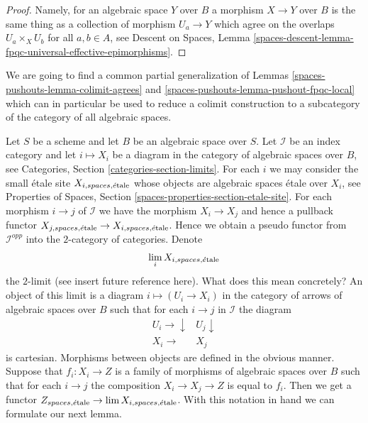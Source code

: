 \begin{proof}
Namely, for an algebraic space $Y$ over $B$ a morphism $X \to Y$ over $B$
is the same thing as a collection of morphism $U_a \to Y$ which agree on
the overlaps $U_a \times_X U_b$ for all $a, b \in A$, see
Descent on Spaces, Lemma
\ref{spaces-descent-lemma-fpqc-universal-effective-epimorphisms}.
\end{proof}

We are going to find a common partial generalization of
Lemmas \ref{spaces-pushouts-lemma-colimit-agrees} and \ref{spaces-pushouts-lemma-pushout-fpqc-local}
which can in particular be used to reduce a colimit construction to a
subcategory of the category of all algebraic spaces.

\medskip\noindent
Let $S$ be a scheme and let $B$ be an algebraic space over $S$. Let
$\mathcal{I}$ be an index category and let $i \mapsto X_i$
be a diagram in the category of algebraic spaces over $B$,
see Categories, Section \ref{categories-section-limits}.
For each $i$ we may consider the small \'etale site
$X_{i, spaces, \acute{e}\text{tale}}$
whose objects are algebraic spaces \'etale over $X_i$, see
Properties of Spaces, Section \ref{spaces-properties-section-etale-site}.
For each morphism $i \to j$ of $\mathcal{I}$ we have the morphism
$X_i \to X_j$ and hence a pullback functor
$X_{j, spaces, \acute{e}\text{tale}} \to X_{i, spaces, \acute{e}\text{tale}}$.
Hence we obtain a pseudo functor from $\mathcal{I}^{opp}$ into
the $2$-category of categories. Denote
$$
\lim_i X_{i, spaces, \acute{e}\text{tale}}
$$
the $2$-limit (see insert future reference here). What does this mean
concretely? An object of this limit is a diagram
$i \mapsto (U_i \to X_i)$ in the category of arrows of
algebraic spaces over $B$
such that for each $i \to j$ in $\mathcal{I}$ the diagram
$$
\begin{array}{cc}U_i \longrightarrow\downarrow & U_j \downarrow \\ X_i \longrightarrow & X_j\end{array}
$$
is cartesian. Morphisms between objects are defined in the obvious manner.
Suppose that $f_i : X_i \to Z$ is a family of morphisms of algebraic
spaces over $B$ such that
for each $i \to j$ the composition $X_i \to X_j \to Z$ is equal to $f_i$.
Then we get a functor $Z_{spaces, \acute{e}\text{tale}} \to \lim X_{i, spaces, \acute{e}\text{tale}}$.
With this notation in hand we can formulate our next lemma.

